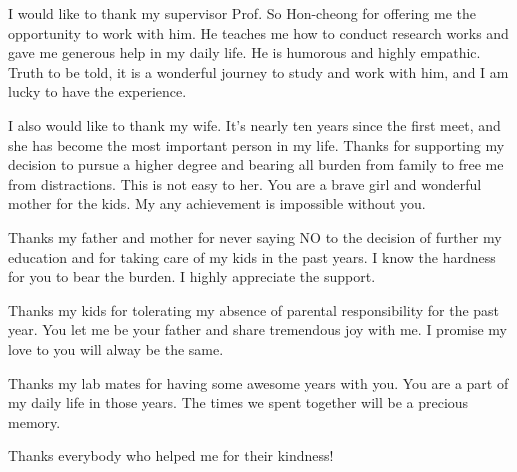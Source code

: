 I would like to thank my supervisor Prof. So Hon-cheong for offering me the opportunity to work with him. He teaches me how to conduct research works and gave me generous help in my daily life. He is humorous and highly empathic.  Truth to be told, it is a wonderful journey to study and work with him, and I am lucky to have the experience. 

I also would like to thank my wife. It's nearly ten years since the first meet, and she has become the most important person in my life. Thanks for supporting my decision to pursue a higher degree and bearing all burden from family to free me from distractions. This is not easy to her. You are a brave girl and wonderful mother for the kids. My any achievement is impossible without you. 

Thanks my father and mother for never saying NO to the decision of further my education and for taking care of my kids in the past years. I know the hardness for you to bear the burden. I highly appreciate the support.

Thanks my kids for tolerating my absence of parental responsibility for the past year. You let me be your father and share tremendous joy with me. I promise my love to you will alway be the same. 

Thanks my lab mates for having some awesome years with you. You are a part of my daily life in those years. The times we spent together will be a precious memory. 

Thanks everybody who helped me for their kindness!